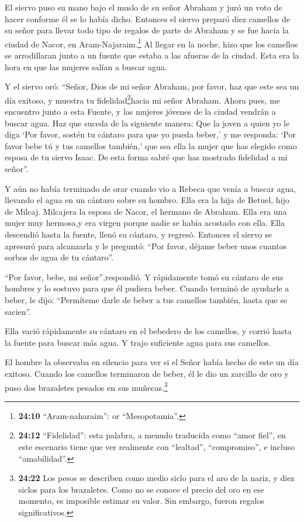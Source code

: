  El siervo puso su mano bajo el muslo de su señor Abraham y
juró un voto de hacer conforme él se lo había dicho. 
Entonces el siervo preparó diez camellos de su señor para llevar todo
tipo de regalos de parte de Abraham y se fue hacia la ciudad de Nacor,
en Aram-Najaraim.\footnote{\textbf{24:10} ``Aram-naharaim'': or
  ``Mesopotamia''.}  Al llegar en la noche, hizo que los
camellos se arrodillaran junto a un fuente que estaba a las afueras de
la ciudad. Esta era la hora en que las mujeres salían a buscar agua.

 Y el siervo oró: ``Señor, Dios de mi señor Abraham, por
favor, haz que este sea un día exitoso, y muestra tu
fidelidad\footnote{\textbf{24:12} ``Fidelidad'': esta palabra, a menudo
  traducida como ``amor fiel'', en este escenario tiene que ver
  realmente con ``lealtad'', ``compromiso'', e incluso ``amabilidad''.}hacia
mi señor Abraham.  Ahora pues, me encuentro junto a esta
Fuente, y las mujeres jóvenes de la ciudad vendrán a buscar agua.
 Haz que suceda de la siguiente manera: Que la joven a
quien yo le diga `Por favor, sostén tu cántaro para que yo pueda beber,'
y me responda: `Por favor bebe tú y tus camellos también,' que sea ella
la mujer que has elegido como esposa de tu siervo Isaac. De esta forma
sabré que has mostrado fidelidad a mi señor''.

 Y aún no había terminado de orar cuando vio a Rebeca que
venía a buscar agua, llevando el agua en un cántaro sobre su hombro.
Ella era la hija de Betuel, hijo de Milcaj. Milcajera la esposa de
Nacor, el hermano de Abraham.  Ella era una mujer muy
hermosa,y era virgen porque nadie se había acostado con ella. Ella
descendió hasta la fuente, llenó su cántaro, y regresó. 
Entonces el siervo se apresuró para alcanzarla y le preguntó: ``Por
favor, déjame beber unos cuantos sorbos de agua de tu cántaro''.

 ``Por favor, bebe, mi señor'',respondió. Y rápidamente
tomó su cántaro de sus hombres y lo sostuvo para que él pudiera beber.
 Cuando terminó de ayudarle a beber, le dijo: ``Permíteme
darle de beber a tus camellos también, hasta que se sacien''.

 Ella vació rápidamente su cántaro en el bebedero de los
camellos, y corrió hasta la fuente para buscar más agua. Y trajo
suficiente agua para sus camellos.

 El hombre la observaba en silencio para ver si el Señor
había hecho de este un día exitoso.  Cuando los camellos
terminaron de beber, él le dio un zarcillo de oro y puso dos brazaletes
pesados en sus muñecas.\footnote{\textbf{24:22} Los pesos se describen
  como medio siclo para el aro de la nariz, y diez siclos para los
  brazaletes. Como no se conoce el precio del oro en ese momento, es
  imposible estimar su valor. Sin embargo, fueron regalos
  significativos.}

